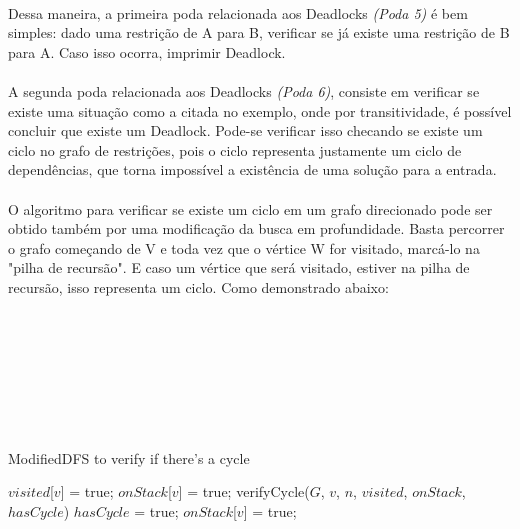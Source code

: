 \documentclass[a4paper, 12pt]{article}
\begin{document}
\paragraph{}
Dessa maneira, a primeira poda relacionada aos Deadlocks \textit{(Poda 5)} é bem simples: dado uma restrição de A para B, verificar se já existe uma restrição de B para A. Caso isso ocorra, imprimir Deadlock.

\paragraph{}
A segunda poda relacionada aos Deadlocks \textit{(Poda 6)}, consiste em verificar se existe uma situação como a citada no exemplo, onde por transitividade, é possível concluir que existe um Deadlock. Pode-se verificar isso checando se existe um ciclo no grafo de restrições, pois o ciclo representa justamente um ciclo de dependências, que torna impossível a existência de uma solução para a entrada.

\paragraph{}
O algoritmo para verificar se existe um ciclo em um grafo direcionado pode ser obtido também por uma modificação da busca em profundidade.
Basta percorrer o grafo começando de V e toda vez que o vértice W for visitado, marcá-lo na "pilha de recursão". E caso um vértice que será visitado, estiver na pilha de recursão, isso representa um ciclo. Como demonstrado abaixo:
\\
\\
\\
\\
\\
\\
\\
\\

\begin{algorithm}
\caption{ModifiedDFS to verify if there's a cycle}
\begin{algorithmic}
    \State $visited$[$v$] = true;
    \State $onStack$[$v$] = true;
				\State verifyCycle($G$, $v$, $n$, $visited$, $onStack$, $hasCycle$)
				\State $hasCycle$ = true;
			\EndIf
		\EndIf  
    \EndFor
    \State $onStack$[$v$] = true;
\EndFunction
\end{algorithmic}
\end{algorithm}
\end{document}

